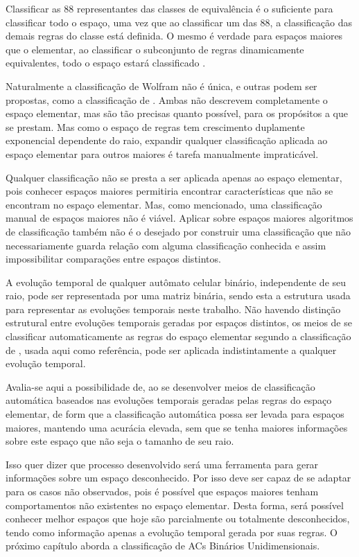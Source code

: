\documentclass[12pt,a4paper]{report}
\begin{document}
	Classificar as 88 representantes das classes de equivalência é o suficiente para classificar todo o espaço, uma vez que ao classificar um das 88, a classificação das demais regras do classe está definida. O mesmo é verdade para espaços maiores que o elementar, ao classificar o subconjunto de regras dinamicamente equivalentes, todo o espaço estará classificado \cite{Wolfram1986}.
	
	Naturalmente a classificação de Wolfram não é única, e outras podem ser propostas, como a classificação de . Ambas não descrevem completamente o espaço elementar, mas são tão precisas quanto possível, para os propósitos a que se prestam. Mas como o espaço de regras tem crescimento duplamente exponencial dependente do raio, expandir qualquer classificação aplicada ao espaço elementar para outros maiores é tarefa manualmente impraticável.
	
	Qualquer classificação não se presta a ser aplicada apenas ao espaço elementar, pois conhecer espaços maiores permitiria encontrar características que não se encontram no espaço elementar. Mas, como mencionado, uma classificação manual de espaços maiores não é viável. Aplicar sobre espaços maiores algoritmos de classificação também não é o desejado por construir uma classificação que não necessariamente guarda relação com alguma classificação conhecida e assim impossibilitar comparações entre espaços distintos.
	
	A evolução temporal de qualquer autômato celular binário, independente de seu raio, pode ser representada por uma matriz binária, sendo esta a estrutura usada para representar as evoluções temporais neste trabalho. Não havendo distinção estrutural entre evoluções temporais geradas por espaços distintos, os meios de se classificar automaticamente as regras do espaço elementar segundo a classificação de , usada aqui como referência, pode ser aplicada indistintamente a qualquer evolução temporal.
	
	Avalia-se aqui a possibilidade de, ao se desenvolver meios de classificação automática baseados nas evoluções temporais geradas pelas regras do espaço elementar, de form que a classificação automática possa ser levada para espaços maiores, mantendo uma acurácia elevada, sem que se tenha maiores informações sobre este espaço que não seja o tamanho de seu raio.
	
	Isso quer dizer que processo desenvolvido será uma ferramenta para gerar informações sobre um espaço desconhecido. Por isso deve ser capaz de se adaptar para os casos não observados, pois é possível que espaços maiores tenham comportamentos não existentes no espaço elementar. Desta forma, será possível conhecer melhor espaços que hoje são parcialmente ou totalmente desconhecidos, tendo como informação apenas a evolução temporal gerada por suas regras. O próximo capítulo aborda a classificação de ACs Binários Unidimensionais.
	
\end{document}

